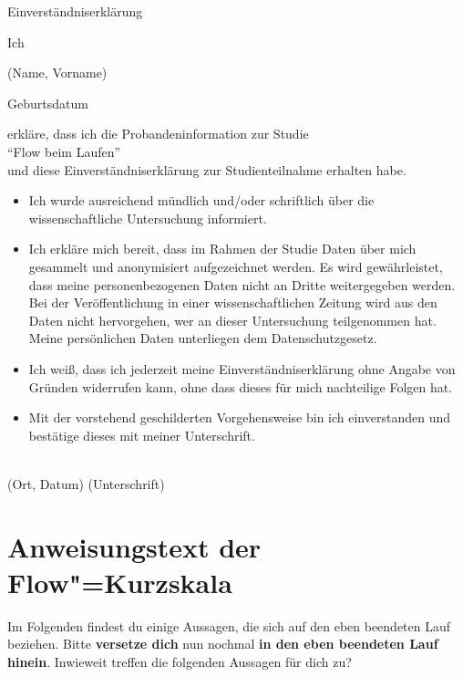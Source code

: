 {\Huge Einverständniserklärung}\\
\begin{singlespace}
	Ich \hrulefill 
	\begin{center}
		(Name, Vorname) 
	\end{center}
	Geburtsdatum \hrulefill 
	\begin{center}
		erkläre, dass ich die Probandeninformation zur Studie\\
		"`Flow beim Laufen"'\\
		und diese Einverständniserklärung zur Studienteilnahme erhalten habe. 
	\end{center}
	\begin{itemize}
		\item Ich wurde ausreichend mündlich und/oder schriftlich über die wissenschaftliche Untersuchung informiert. 
		\item Ich erkläre mich bereit, dass im Rahmen der Studie Daten über mich gesammelt und anonymisiert aufgezeichnet werden. Es wird gewährleistet, dass meine personenbezogenen Daten nicht an Dritte weitergegeben werden. Bei der Veröffentlichung in einer wissenschaftlichen Zeitung wird aus den Daten nicht hervorgehen, wer an dieser Untersuchung teilgenommen hat. Meine persönlichen Daten unterliegen dem Datenschutzgesetz. 
		\item Ich weiß, dass ich jederzeit meine Einverständniserklärung ohne Angabe von Gründen widerrufen kann, ohne dass dieses für mich nachteilige Folgen hat. 
		\item Mit der vorstehend geschilderten Vorgehensweise bin ich einverstanden und bestätige dieses mit meiner Unterschrift. 
	\end{itemize}
	\vspace{15mm} \hrulefill \\
	(Ort, Datum) \hspace{20mm} (Unterschrift) 
\end{singlespace}
\newpage

\section{Anweisungstext der Flow"=Kurzskala} 

\label{sec:anweisungstext_der_flow_kurzskala}

Im Folgenden findest du einige Aussagen, die sich auf den eben beendeten Lauf beziehen. Bitte \textbf{versetze dich} nun nochmal \textbf{in den eben beendeten Lauf hinein}. Inwieweit treffen die folgenden Aussagen für dich zu?

